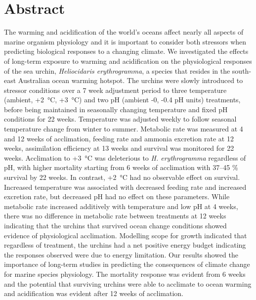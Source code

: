 \documentclass[a4paper,10pt, oneside]{memoir}
\begin{document}

\hypertarget{abstract-2}{%
\section*{Abstract}\label{abstract-2}}

The warming and acidification of the world's oceans affect nearly all aspects of marine organism physiology and it is important to consider both stressors when predicting biological responses to a changing climate.
We investigated the effects of long-term exposure to warming and acidification on the physiological responses of the sea urchin, \textit{Heliocidaris erythrogramma}, a species that resides in the south-east Australian ocean warming hotspot.
The urchins were slowly introduced to stressor conditions over a 7 week adjustment period to three temperature (ambient, +\SI{2}{\celsius}, +\SI{3}{\celsius}) and two pH (ambient -0, -0.4 pH units) treatments, before being maintained in seasonally changing temperature and fixed pH conditions for 22 weeks.
Temperature was adjusted weekly to follow seasonal temperature change from winter to summer.
Metabolic rate was measured at 4 and 12 weeks of acclimation, feeding rate and ammonia excretion rate at 12 weeks, assimilation efficiency at 13 weeks and survival was monitored for 22 weeks.
Acclimation to +\SI{3}{\celsius} was deleterious to \textit{H. erythrogramma} regardless of pH, with higher mortality starting from 6 weeks of acclimation with 37--45 \% survival by 22 weeks. In contrast, +\SI{2}{\celsius} had no observable effect on survival.
Increased temperature was associated with decreased feeding rate and increased excretion rate, but decreased pH had no effect on these parameters.
While metabolic rate increased additively with temperature and low pH at 4 weeks, there was no difference in metabolic rate between treatments at 12 weeks indicating that the urchins that survived ocean change conditions showed evidence of physiological acclimation.
Modelling scope for growth indicated that regardless of treatment, the urchins had a net positive energy budget indicating the responses observed were due to energy limitation.
Our results showed the importance of long-term studies in predicting the consequences of climate change for marine species physiology.
The mortality response was evident from 6 weeks and the potential that surviving urchins were able to acclimate to ocean warming and acidification was evident after 12 weeks of acclimation.
\end{document}
